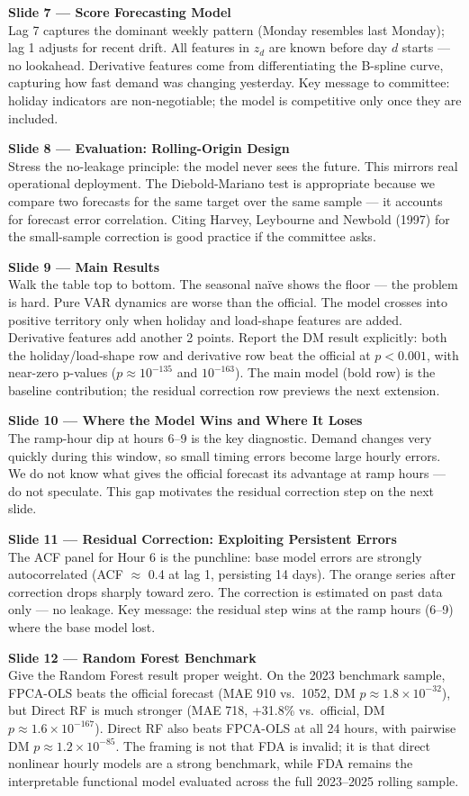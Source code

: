 \documentclass[11pt,a4paper]{article}
\newcommand{\notecard}[2]{%
  \begin{mdframed}[backgroundcolor=noteframe, linecolor=accentblue,
                   linewidth=1pt, roundcorner=4pt,
                   innertopmargin=6pt, innerbottommargin=8pt,
                   innerleftmargin=10pt, innerrightmargin=10pt,
                   skipabove=8pt, skipbelow=0pt]
    {\small\textcolor{accentblue}{\textbf{#1}}}\\[4pt]
    \small #2
  \end{mdframed}
}
\begin{document}
\notecard{Slide 7 --- Score Forecasting Model}{
Lag 7 captures the dominant weekly pattern (Monday resembles last Monday); lag 1 adjusts for recent drift. All features in $z_d$ are known before day $d$ starts --- no lookahead. Derivative features come from differentiating the B-spline curve, capturing how fast demand was changing yesterday. Key message to committee: holiday indicators are non-negotiable; the model is competitive only once they are included.
}

\notecard{Slide 8 --- Evaluation: Rolling-Origin Design}{
Stress the no-leakage principle: the model never sees the future. This mirrors real operational deployment. The Diebold-Mariano test is appropriate because we compare two forecasts for the same target over the same sample --- it accounts for forecast error correlation. Citing Harvey, Leybourne and Newbold (1997) for the small-sample correction is good practice if the committee asks.
}

\notecard{Slide 9 --- Main Results}{
Walk the table top to bottom. The seasonal na\"ive shows the floor --- the problem is hard. Pure VAR dynamics are worse than the official. The model crosses into positive territory only when holiday and load-shape features are added. Derivative features add another 2 points. Report the DM result explicitly: both the holiday/load-shape row and derivative row beat the official at $p<0.001$, with near-zero p-values ($p \approx 10^{-135}$ and $10^{-163}$). The main model (bold row) is the baseline contribution; the residual correction row previews the next extension.
}

\notecard{Slide 10 --- Where the Model Wins and Where It Loses}{
The ramp-hour dip at hours 6--9 is the key diagnostic. Demand changes very quickly during this window, so small timing errors become large hourly errors. We do not know what gives the official forecast its advantage at ramp hours --- do not speculate. This gap motivates the residual correction step on the next slide.
}

\notecard{Slide 11 --- Residual Correction: Exploiting Persistent Errors}{
The ACF panel for Hour 6 is the punchline: base model errors are strongly autocorrelated (ACF $\approx$ 0.4 at lag 1, persisting 14 days). The orange series after correction drops sharply toward zero. The correction is estimated on past data only --- no leakage. Key message: the residual step wins at the ramp hours (6--9) where the base model lost.
}

\notecard{Slide 12 --- Random Forest Benchmark}{
Give the Random Forest result proper weight. On the 2023 benchmark sample, FPCA-OLS beats the official forecast (MAE 910 vs.\ 1052, DM $p \approx 1.8\times10^{-32}$), but Direct RF is much stronger (MAE 718, +31.8\% vs.\ official, DM $p \approx 1.6\times10^{-167}$). Direct RF also beats FPCA-OLS at all 24 hours, with pairwise DM $p \approx 1.2\times10^{-85}$. The framing is not that FDA is invalid; it is that direct nonlinear hourly models are a strong benchmark, while FDA remains the interpretable functional model evaluated across the full 2023--2025 rolling sample.
}
\end{document}
